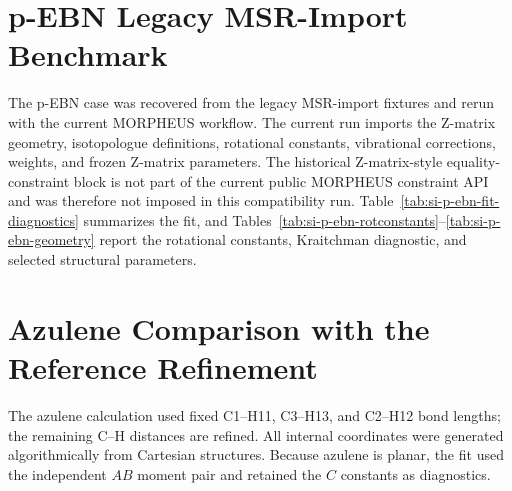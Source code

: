 \documentclass[12pt]{article}
\begin{document}
\section{p-EBN Legacy MSR-Import Benchmark}

The p-EBN case was recovered from the legacy MSR-import fixtures and rerun
with the current MORPHEUS workflow. The current run imports the Z-matrix
geometry, isotopologue definitions, rotational constants, vibrational
corrections, weights, and frozen Z-matrix parameters. The historical
Z-matrix-style equality-constraint block is not part of the current public MORPHEUS
constraint API and was therefore not imposed in this compatibility run.
Table~\ref{tab:si-p-ebn-fit-diagnostics} summarizes the fit, and
Tables~\ref{tab:si-p-ebn-rotconstants}--\ref{tab:si-p-ebn-geometry} report the
rotational constants, Kraitchman diagnostic, and selected structural
parameters.









\section{Azulene Comparison with the Reference Refinement}

The azulene calculation used fixed C1--H11, C3--H13, and C2--H12 bond lengths; the remaining C--H distances are refined. All internal coordinates were generated algorithmically from Cartesian structures. Because azulene is planar, the fit used the independent $AB$ moment pair and retained the $C$ constants as diagnostics.
\end{document}
